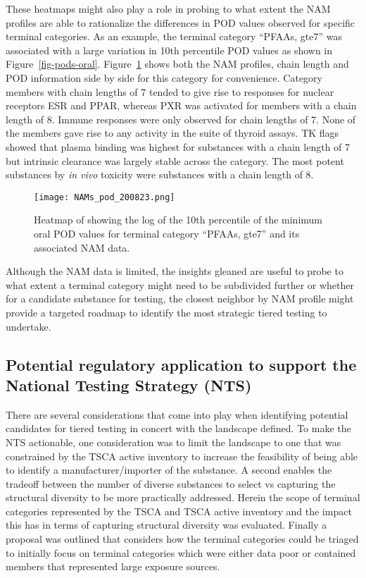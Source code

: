 \documentclass[
  super,
  preprint,
  3p]{elsarticle}
\begin{document}
These heatmaps might also play a role in probing to what extent the NAM
profiles are able to rationalize the differences in POD values observed
for specific terminal categories. As an example, the terminal category
``PFAAs, gte7'' was associated with a large variation in 10th percentile
POD values as shown in Figure~\ref{fig-pods-oral}.
Figure~\ref{fig-nams-pod} shows both the NAM profiles, chain length and
POD information side by side for this category for convenience. Category
members with chain lengths of 7 tended to give rise to responses for
nuclear receptors ESR and PPAR, whereas PXR was activated for members
with a chain length of 8. Immune responses were only observed for chain
lengths of 7. None of the members gave rise to any activity in the suite
of thyroid assays. TK flags showed that plasma binding was highest for
substances with a chain length of 7 but intrinsic clearance was largely
stable across the category. The most potent substances by \emph{in vivo}
toxicity were substances with a chain length of 8.

\begin{figure}

{\centering \texttt{[image: NAMs\_pod\_200823.png]}

}

\caption{\label{fig-nams-pod}Heatmap of showing the log of the 10th
percentile of the minimum oral POD values for terminal category ``PFAAs,
gte7'' and its associated NAM data.}

\end{figure}

Although the NAM data is limited, the insights gleaned are useful to
probe to what extent a terminal category might need to be subdivided
further or whether for a candidate substance for testing, the closest
neighbor by NAM profile might provide a targeted roadmap to identify the
most strategic tiered testing to undertake.

\hypertarget{sec-tsca}{%
\subsection{Potential regulatory application to support the National
Testing Strategy (NTS)}\label{sec-tsca}}

There are several considerations that come into play when identifying
potential candidates for tiered testing in concert with the landscape
defined. To make the NTS actionable, one consideration was to limit the
landscape to one that was constrained by the TSCA active inventory to
increase the feasibility of being able to identify a
manufacturer/importer of the substance. A second enables the tradeoff
between the number of diverse substances to select vs capturing the
structural diversity to be more practically addressed. Herein the scope
of terminal categories represented by the TSCA and TSCA active inventory
and the impact this has in terms of capturing structural diversity was
evaluated. Finally a proposal was outlined that considers how the
terminal categories could be triaged to initially focus on terminal
categories which were either data poor or contained members that
represented large exposure sources.
\end{document}
